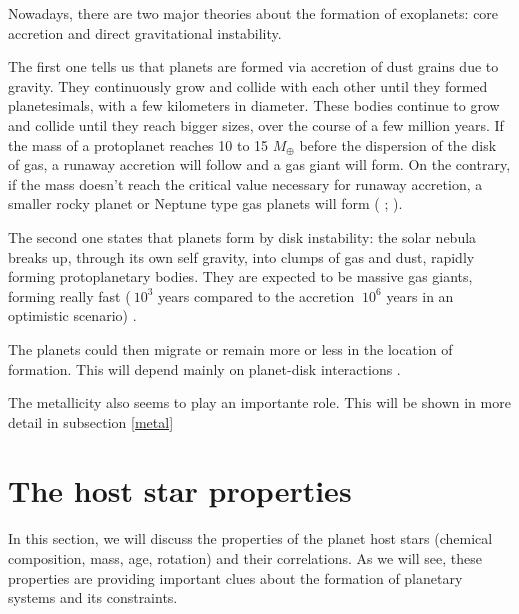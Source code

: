 \documentclass[dvips,12pt,a4paper]{report}
\begin{document}
Nowadays, there are two major theories about the formation of exoplanets: core accretion and direct gravitational instability. 

The first one tells us that planets are formed via accretion of dust grains due to gravity. They continuously grow and collide with each other until they formed planetesimals, with a few kilometers in diameter. These bodies continue to grow and collide until they reach bigger sizes, over the course of a few million years. If the mass of a protoplanet reaches 10 to 15 $M_{\oplus}$ before the dispersion of the disk of gas, a runaway accretion will follow and a gas giant will form. On the contrary, if the mass doesn't reach the critical value necessary for runaway accretion, a smaller rocky planet or Neptune type gas planets will form (\citeauthor{Pollack-1996} \citeyear{Pollack-1996}; \citeauthor{Alibert-2006} \citeyear{Alibert-2006}). 

The second one states that planets form by disk instability: the solar nebula breaks up, through its own self gravity, into clumps of gas and dust, rapidly forming protoplanetary bodies. They are expected to be massive gas giants, forming really fast ($~10^3$ years compared to the accretion $~10^6$ years in an optimistic scenario) \citep{Boss-1997}. 

The planets could then migrate or remain more or less in the location of formation. This will depend mainly on planet-disk interactions \citep{Trilling-1998}.

The metallicity also seems to play an importante role. This will be shown in more detail in subsection \ref{metal}

\section{The host star properties}

In this section, we will discuss the properties of the planet host stars (chemical composition, mass, age, rotation) and their correlations. As we will see, these properties are providing important clues about the formation of planetary systems and its constraints.
\end{document}
